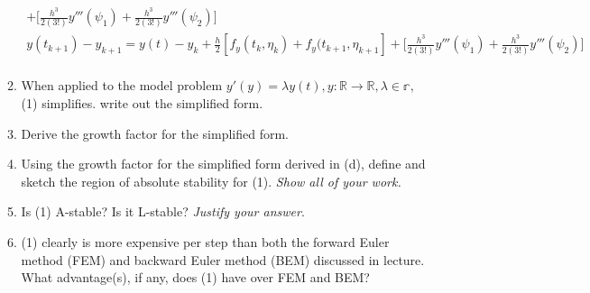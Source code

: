 \documentclass{article}
\begin{document}
\begin{enumerate}
\begin{enumerate}
\begin{align*}
               [y'(t) + y'(t + h)
               - f(t_k, y_k) - f(t_{k+1}, y_{k+1})] + \bigg[
               \frac{h^3}{2(3!)}y'''(\psi_1) 
               + \frac{h^3}{2(3!)}y'''(\psi_2)\bigg] \\
               y(t_{k+1}) - y_{k+1} = 
               y(t) - y_k + \frac{h}{2}
               [f_y(t_k, \eta_k) + f_y(t_{k+1}, \eta_{k+1}] + \bigg[
               \frac{h^3}{2(3!)}y'''(\psi_1) 
               + \frac{h^3}{2(3!)}y'''(\psi_2)\bigg] \\
                \end{align*}
            \item When applied to the model problem $y'(y) = \lambda y(t),
                y: \mathbb{R} \rightarrow \mathbb{R}, \lambda \in 
                \mathbb{r},$ (1) simplifies. write out the simplified form.
            \item Derive the growth factor for the simplified form.
            \item Using the growth factor for the simplified form derived
                in (d), define and sketch the region of absolute stability
                for (1). \textit{Show all of your work.}
            \item Is (1) A-stable? Is it L-stable? \textit{Justify your 
                answer}.
            \item (1) clearly is more expensive per step than both the
                forward Euler method (FEM) and backward Euler method
                (BEM) discussed in lecture. What advantage(s), if any,
                does (1) have over FEM and BEM?
        \end{enumerate}
\end{enumerate}
\end{document}
